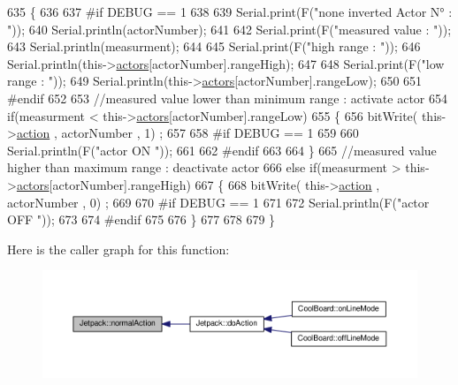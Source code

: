 \begin{DoxyCode}
635 \{
636 
637 \textcolor{preprocessor}{#if DEBUG == 1}
638     
639     Serial.print(F(\textcolor{stringliteral}{"none inverted Actor N° : "}));
640     Serial.println(actorNumber);
641 
642     Serial.print(F(\textcolor{stringliteral}{"measured value : "}));
643     Serial.println(measurment);
644 
645     Serial.print(F(\textcolor{stringliteral}{"high range : "}));
646     Serial.println(this->\hyperlink{class_jetpack_a7e16d2f97837f9712a2e6de1c50d99db}{actors}[actorNumber].rangeHigh);
647 
648     Serial.print(F(\textcolor{stringliteral}{"low range : "}));
649     Serial.println(this->\hyperlink{class_jetpack_a7e16d2f97837f9712a2e6de1c50d99db}{actors}[actorNumber].rangeLow);
650 
651 \textcolor{preprocessor}{#endif}
652 
653     \textcolor{comment}{//measured value lower than minimum range : activate actor}
654     \textcolor{keywordflow}{if}(measurment < this->\hyperlink{class_jetpack_a7e16d2f97837f9712a2e6de1c50d99db}{actors}[actorNumber].rangeLow)
655     \{
656         bitWrite( this->\hyperlink{class_jetpack_aca3142925a7b0834b34ae91d26af7765}{action} , actorNumber , 1) ;
657 
658 \textcolor{preprocessor}{    #if DEBUG == 1 }
659 
660         Serial.println(F(\textcolor{stringliteral}{"actor ON "}));
661     
662 \textcolor{preprocessor}{    #endif}
663                 
664     \}
665     \textcolor{comment}{//measured value higher than maximum range : deactivate actor}
666     \textcolor{keywordflow}{else} \textcolor{keywordflow}{if}(measurment > this->\hyperlink{class_jetpack_a7e16d2f97837f9712a2e6de1c50d99db}{actors}[actorNumber].rangeHigh)
667     \{
668         bitWrite( this->\hyperlink{class_jetpack_aca3142925a7b0834b34ae91d26af7765}{action} , actorNumber , 0) ;
669 
670 \textcolor{preprocessor}{    #if DEBUG == 1 }
671 
672         Serial.println(F(\textcolor{stringliteral}{"actor OFF "}));
673     
674 \textcolor{preprocessor}{    #endif}
675     
676     \}
677 
678 
679 \}
\end{DoxyCode}
Here is the caller graph for this function\+:
\nopagebreak
\begin{figure}[H]
\begin{center}
\leavevmode
\includegraphics[width=350pt]{df/d1d/class_jetpack_a65ce9533c39fa71e4945b970bf14b980_icgraph}
\end{center}
\end{figure}
\mbox{\label{class_jetpack_ac54a7bb4f9166bee32052253d9b1d306}} 
